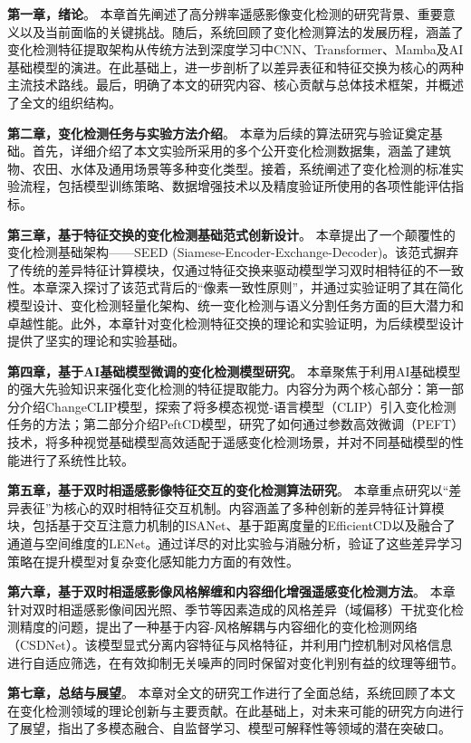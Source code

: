 \textbf{第一章，绪论}。 本章首先阐述了高分辨率遥感影像变化检测的研究背景、重要意义以及当前面临的关键挑战。随后，系统回顾了变化检测算法的发展历程，涵盖了变化检测特征提取架构从传统方法到深度学习中CNN、Transformer、Mamba及AI基础模型的演进。在此基础上，进一步剖析了以差异表征和特征交换为核心的两种主流技术路线。最后，明确了本文的研究内容、核心贡献与总体技术框架，并概述了全文的组织结构。

\textbf{第二章，变化检测任务与实验方法介绍}。 本章为后续的算法研究与验证奠定基础。首先，详细介绍了本文实验所采用的多个公开变化检测数据集，涵盖了建筑物、农田、水体及通用场景等多种变化类型。接着，系统阐述了变化检测的标准实验流程，包括模型训练策略、数据增强技术以及精度验证所使用的各项性能评估指标。

\textbf{第三章，基于特征交换的变化检测基础范式创新设计}。 本章提出了一个颠覆性的变化检测基础架构——SEED (Siamese-Encoder-Exchange-Decoder)。该范式摒弃了传统的差异特征计算模块，仅通过特征交换来驱动模型学习双时相特征的不一致性。本章深入探讨了该范式背后的“像素一致性原则”，并通过实验证明了其在简化模型设计、变化检测轻量化架构、统一变化检测与语义分割任务方面的巨大潜力和卓越性能。此外，本章针对变化检测特征交换的理论和实验证明，为后续模型设计提供了坚实的理论和实验基础。

\textbf{第四章，基于AI基础模型微调的变化检测模型研究}。 本章聚焦于利用AI基础模型的强大先验知识来强化变化检测的特征提取能力。内容分为两个核心部分：第一部分介绍ChangeCLIP模型，探索了将多模态视觉-语言模型（CLIP）引入变化检测任务的方法；第二部分介绍PeftCD模型，研究了如何通过参数高效微调（PEFT）技术，将多种视觉基础模型高效适配于遥感变化检测场景，并对不同基础模型的性能进行了系统性比较。

\textbf{第五章，基于双时相遥感影像特征交互的变化检测算法研究}。 本章重点研究以“差异表征”为核心的双时相特征交互机制。内容涵盖了多种创新的差异特征计算模块，包括基于交互注意力机制的ISANet、基于距离度量的EfficientCD以及融合了通道与空间维度的LENet。通过详尽的对比实验与消融分析，验证了这些差异学习策略在提升模型对复杂变化感知能力方面的有效性。

\textbf{第六章，基于双时相遥感影像风格解缠和内容细化增强遥感变化检测方法}。 本章针对双时相遥感影像间因光照、季节等因素造成的风格差异（域偏移）干扰变化检测精度的问题，提出了一种基于内容-风格解耦与内容细化的变化检测网络（CSDNet）。该模型显式分离内容特征与风格特征，并利用门控机制对风格信息进行自适应筛选，在有效抑制无关噪声的同时保留对变化判别有益的纹理等细节。

\textbf{第七章，总结与展望}。 本章对全文的研究工作进行了全面总结，系统回顾了本文在变化检测领域的理论创新与主要贡献。在此基础上，对未来可能的研究方向进行了展望，指出了多模态融合、自监督学习、模型可解释性等领域的潜在突破口。